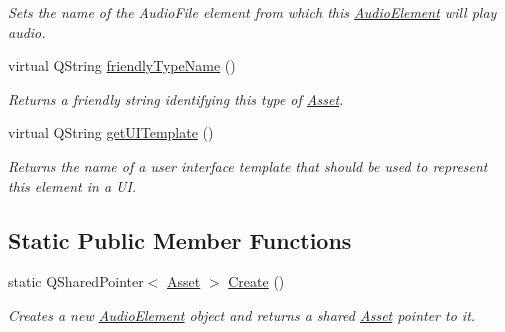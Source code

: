 \begin{DoxyCompactItemize}
\begin{DoxyCompactList}\small\item\em Sets the name of the Audio\-File element from which this \hyperlink{class_picto_1_1_audio_element}{Audio\-Element} will play audio. \end{DoxyCompactList}\item 
virtual Q\-String \hyperlink{class_picto_1_1_audio_element_acdc7b75fe3f0f438b23f7d770fb4ec9f}{friendly\-Type\-Name} ()
\begin{DoxyCompactList}\small\item\em Returns a friendly string identifying this type of \hyperlink{class_picto_1_1_asset}{Asset}. \end{DoxyCompactList}\item 
\hypertarget{class_picto_1_1_audio_element_a80da674a81239be8282a6b9b646ff154}{virtual Q\-String \hyperlink{class_picto_1_1_audio_element_a80da674a81239be8282a6b9b646ff154}{get\-U\-I\-Template} ()}\label{class_picto_1_1_audio_element_a80da674a81239be8282a6b9b646ff154}

\begin{DoxyCompactList}\small\item\em Returns the name of a user interface template that should be used to represent this element in a U\-I. \end{DoxyCompactList}\end{DoxyCompactItemize}
\subsection*{Static Public Member Functions}
\begin{DoxyCompactItemize}
\item 
\hypertarget{class_picto_1_1_audio_element_a7850552df518085e66630356f2280c6c}{static Q\-Shared\-Pointer$<$ \hyperlink{class_picto_1_1_asset}{Asset} $>$ \hyperlink{class_picto_1_1_audio_element_a7850552df518085e66630356f2280c6c}{Create} ()}\label{class_picto_1_1_audio_element_a7850552df518085e66630356f2280c6c}

\begin{DoxyCompactList}\small\item\em Creates a new \hyperlink{class_picto_1_1_audio_element}{Audio\-Element} object and returns a shared \hyperlink{class_picto_1_1_asset}{Asset} pointer to it. \end{DoxyCompactList}\end{DoxyCompactItemize}
